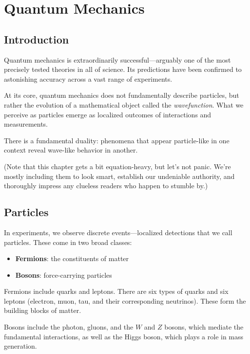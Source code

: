 \chapter{Quantum Mechanics}
\label{chap:quantum-mechanics}

\section{Introduction}

Quantum mechanics is extraordinarily successful—arguably one of the most precisely tested theories in all of science.
Its predictions have been confirmed to astonishing accuracy across a vast range of experiments.

At its core, quantum mechanics does not fundamentally describe particles, but rather the evolution of a mathematical object called the \emph{wavefunction}. What we perceive as particles emerge as localized outcomes of interactions and measurements.

There is a fundamental duality: phenomena that appear particle-like in one context reveal wave-like behavior in another.


(Note that this chapter gets a bit equation-heavy, but let's not panic.
We’re mostly including them to look smart, establish our undeniable authority, and thoroughly impress any clueless readers who happen to stumble by.)



\section{Particles}

In experiments, we observe discrete events—localized detections that we call particles. These come in two broad classes:

\begin{itemize}
\item \textbf{Fermions}: the constituents of matter
\item \textbf{Bosons}: force-carrying particles
\end{itemize}

Fermions include quarks and leptons. There are six types of quarks and six leptons (electron, muon, tau, and their corresponding neutrinos). These form the building blocks of matter.

Bosons include the photon, gluons, and the $W$ and $Z$ bosons, which mediate the fundamental interactions, as well as the Higgs boson, which plays a role in mass generation.

